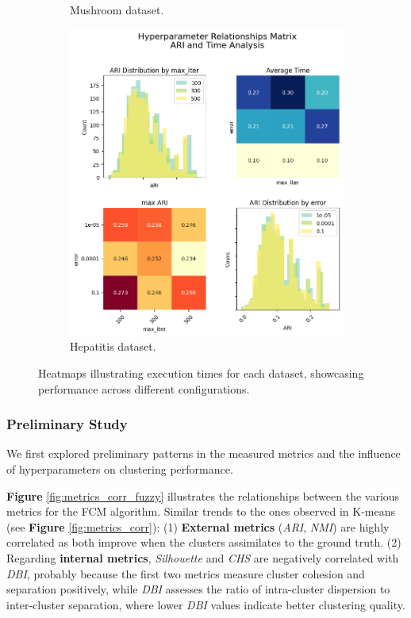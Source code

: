 \begin{figure}[H]
\begin{subfigure}{0.32\textwidth}
        \caption{Mushroom dataset.}
    \end{subfigure}
    \begin{subfigure}{0.32\textwidth}
        \centering
        \includegraphics[width=\linewidth]{figures/FuzzyCMeans/hepatitis_error_iter_pairplot}
        \caption{Hepatitis dataset.}
    \end{subfigure}
    \caption{Heatmaps illustrating execution times for each dataset, showcasing performance across different configurations.}
    \label{fig:error-iter-fuzzy}
\end{figure}


\subsubsection{Preliminary Study}

We first explored preliminary patterns in the measured metrics and the influence of hyperparameters on clustering performance.


\textbf{Figure} \ref{fig:metrics_corr_fuzzy} illustrates the relationships between the various metrics for the FCM algorithm. Similar trends to the ones observed in K-means (see \textbf{Figure} \ref{fig:metrics_corr}): (1) \textbf{External metrics} (\textit{ARI}, \textit{NMI}) are highly correlated as both improve when the clusters assimilates to the ground truth. (2) Regarding \textbf{internal metrics}, \textit{Silhouette} and \textit{CHS} are negatively correlated with \textit{DBI}, probably because the first two metrics measure cluster cohesion and separation positively, while \textit{DBI} assesses the ratio of intra-cluster dispersion to inter-cluster separation, where lower \textit{DBI} values indicate better clustering quality.

